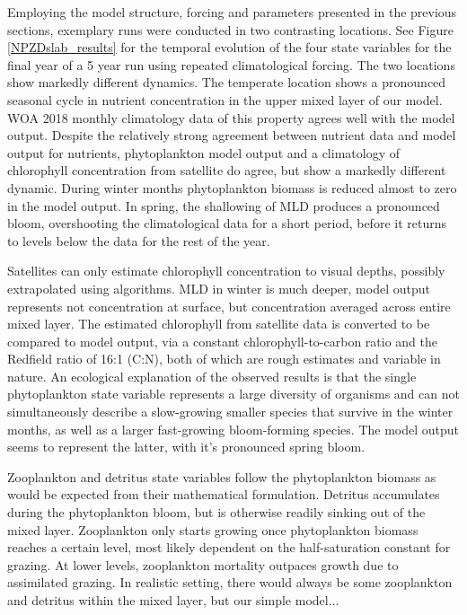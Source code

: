 \documentclass[journal abbreviation, manuscript]{copernicus}
\begin{document}
Employing the model structure, forcing and parameters presented in the previous sections, exemplary runs were conducted in two contrasting locations. See Figure \ref{NPZDslab_results} for the temporal evolution of the four state variables for the final year of a 5 year run using repeated climatological forcing. 
The two locations show markedly different dynamics. The temperate location shows a pronounced seasonal cycle in nutrient concentration in the upper mixed layer of our model. WOA 2018 monthly climatology data of this property agrees well with the model output. Despite the relatively strong agreement between nutrient data and model output for nutrients, phytoplankton model output and a climatology of chlorophyll concentration from satellite do agree, but show a markedly different dynamic. During winter months phytoplankton biomass is reduced almost to zero in the model output. In spring, the shallowing of MLD produces a pronounced bloom, overshooting the climatological data for a short period, before it returns to levels below the data for the rest of the year. 

Satellites can only estimate chlorophyll concentration to visual depths, possibly extrapolated using algorithms. MLD in winter is much deeper, model output represents not concentration at surface, but concentration averaged across entire mixed layer.
The estimated chlorophyll from satellite data is converted to be compared to model output, via a constant chlorophyll-to-carbon ratio and the Redfield ratio of 16:1 (C:N), both of which are rough estimates and variable in nature. 
An ecological explanation of the observed results is that the single phytoplankton state variable represents a large diversity of organisms and can not simultaneously describe a slow-growing smaller species that survive in the winter months, as well as a larger fast-growing bloom-forming species. The model output seems to represent the latter, with it's pronounced spring bloom. 

Zooplankton and detritus state variables follow the phytoplankton biomass as would be expected from their mathematical formulation. Detritus accumulates during the phytoplankton bloom, but is otherwise readily sinking out of the mixed layer. Zooplankton only starts growing once phytoplankton biomass reaches a certain level, most likely dependent on the half-saturation constant for grazing. At lower levels, zooplankton mortality outpaces growth due to assimilated grazing. 
In realistic setting, there would always be some zooplankton and detritus within the mixed layer, but our simple model...
\end{document}
